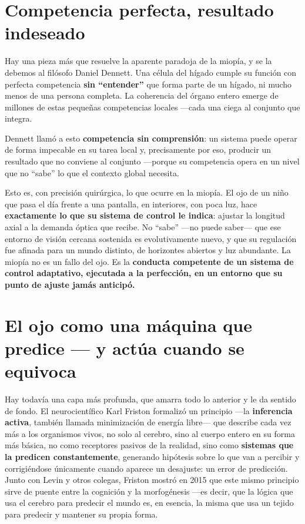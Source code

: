 \documentclass[10pt,a4paper]{article}
\providecommand{\enquote}[1]{``#1''}
\begin{document}
\section{Competencia perfecta, resultado indeseado}

Hay una pieza m\'as que resuelve la aparente paradoja de la miop\'ia, y se la debemos al fil\'osofo Daniel Dennett. Una c\'elula del h\'igado cumple su funci\'on con perfecta competencia \textbf{sin \enquote{entender}} que forma parte de un h\'igado, ni mucho menos de una persona completa. La coherencia del \'organo entero emerge de millones de estas peque\~nas competencias locales ---cada una ciega al conjunto que integra.

Dennett llam\'o a esto \textbf{competencia sin comprensi\'on}: un sistema puede operar de forma impecable en su tarea local y, precisamente por eso, producir un resultado que no conviene al conjunto ---porque su competencia opera en un nivel que no \enquote{sabe} lo que el contexto global necesita.

Esto es, con precisi\'on quir\'urgica, lo que ocurre en la miop\'ia. El ojo de un ni\~no que pasa el d\'ia frente a una pantalla, en interiores, con poca luz, hace \textbf{exactamente lo que su sistema de control le indica}: ajustar la longitud axial a la demanda \'optica que recibe. No \enquote{sabe} ---no puede saber--- que ese entorno de visi\'on cercana sostenida es evolutivamente nuevo, y que su regulaci\'on fue afinada para un mundo distinto, de horizontes abiertos y luz abundante. La miop\'ia no es un fallo del ojo. Es la \textbf{conducta competente de un sistema de control adaptativo, ejecutada a la perfecci\'on, en un entorno que su punto de ajuste jam\'as anticip\'o.}

\section{El ojo como una m\'aquina que predice --- y act\'ua cuando se equivoca}

Hay todav\'ia una capa m\'as profunda, que amarra todo lo anterior y le da sentido de fondo. El neurocient\'ifico Karl Friston formaliz\'o un principio ---la \textbf{inferencia activa}, tambi\'en llamada minimizaci\'on de energ\'ia libre--- que describe cada vez m\'as a los organismos vivos, no solo al cerebro, sino al cuerpo entero en su forma m\'as b\'asica, no como receptores pasivos de la realidad, sino como \textbf{sistemas que la predicen constantemente}, generando hip\'otesis sobre lo que van a percibir y corrigi\'endose \'unicamente cuando aparece un desajuste: un error de predicci\'on. Junto con Levin y otros colegas, Friston mostr\'o en 2015 que este mismo principio sirve de puente entre la cognici\'on y la morfog\'enesis ---es decir, que la l\'ogica que usa el cerebro para predecir el mundo es, en esencia, la misma que usa un tejido para predecir y mantener su propia forma.
\end{document}
